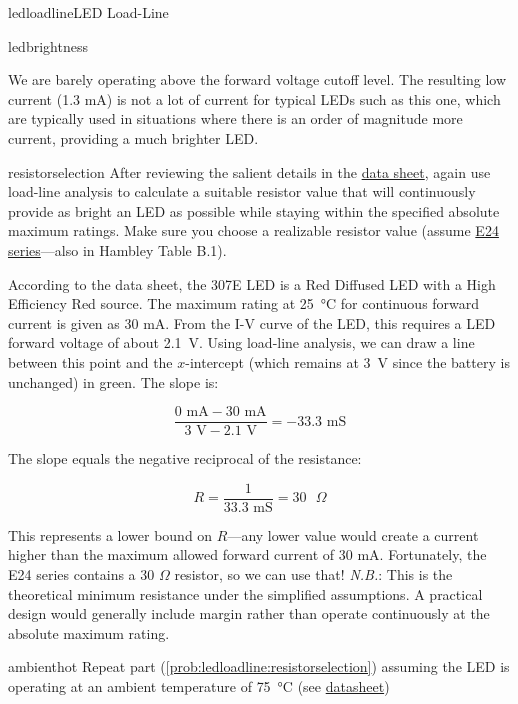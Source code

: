 \begin{mainquestion}{ledloadline}{LED Load-Line}
\begin{partquestion}{ledbrightness}
\begin{answer}
We are barely operating above the forward voltage cutoff level. The resulting low current (1.3 mA) is not a lot of current for typical LEDs such as this one, which are typically used in situations where there is an order of magnitude more current, providing a much brighter LED.
\end{answer}
\end{partquestion}

\begin{partquestion}{resistorselection}
{After reviewing the salient details in the \href{https://www.jameco.com/Jameco/Products/ProdDS/697522.pdf}{data sheet}, again use load-line analysis to calculate a suitable resistor value that will continuously provide as bright an LED as possible while staying within the specified absolute maximum ratings. Make sure you choose a realizable resistor value (assume \href{https://asenergi.com/pdf/resistors/standard-resistor-values-e24.pdf}{E24 series}---also in Hambley Table B.1).}

\begin{answer}
According to the data sheet, the 307E LED is a Red Diffused LED with a High Efficiency Red source. The maximum rating at 25~°C for continuous forward current is given as 30 mA. From the I-V curve of the LED, this requires a LED forward voltage of about 2.1~V. Using load-line analysis, we can draw a line between this point and the $x$-intercept (which remains at 3~V since the battery is unchanged) in green. The slope is:

\[
\frac{0\text{ mA} - 30\text{ mA}}{3\text{ V} - 2.1\text{ V}} = -33.3\text{ mS}
\]

The slope equals the negative reciprocal of the resistance:

\[
R = \frac{1}{33.3\text{ mS}} = 30\text{ }\Omega
\]

This represents a lower bound on $R$---any lower value would create a current higher than the maximum allowed forward current of 30 mA. Fortunately, the E24 series contains a 30 $\Omega$ resistor, so we can use that! \textit{N.B.}: This is the theoretical minimum resistance under the simplified assumptions. A practical design would generally include margin rather than operate continuously at the absolute maximum rating.
\end{answer}
\end{partquestion}

\begin{partquestion}{ambienthot}
{Repeat part (\cref{prob:ledloadline:resistorselection}) assuming the LED is operating at an ambient temperature of \qty{75}{\celsius} (see \href{https://www.jameco.com/Jameco/Products/ProdDS/697522.pdf}{datasheet})}


\end{partquestion}
\end{mainquestion}
